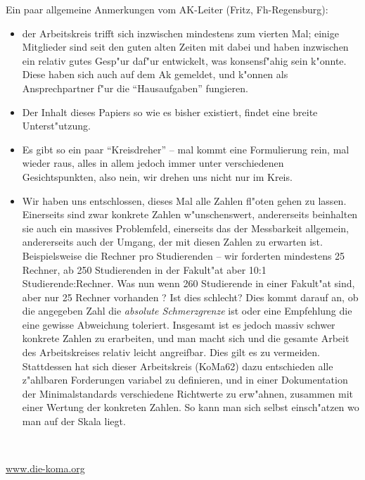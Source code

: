 \documentclass[10pt,twoside,a5paper,openright]{book}
\newenvironment{komacmt62}{%
\marginpar{\framebox{62}} %
\begin{center}\begin{minipage}{.8\textwidth}\normalfont \mdseries \sffamily \small \color{grau} }{\end{minipage}\end{center} %
}
\begin{document}




\newpage
\tableofcontents\thispagestyle{fancy}


\setlength{\parskip}{1.5ex}

\begin{kcmt62}
\begin{komacmt62}
Ein paar allgemeine Anmerkungen vom AK-Leiter (Fritz, Fh-Regensburg):
\begin{itemize}
\item der Arbeitskreis trifft sich inzwischen mindestens zum vierten Mal; einige
 Mitglieder sind seit den guten alten Zeiten mit dabei und haben inzwischen ein
 relativ gutes Gesp"ur daf"ur entwickelt, was konsensf"ahig sein k"onnte. Diese
 haben sich auch auf dem Ak gemeldet, und k"onnen als Ansprechpartner f"ur die
 "`Hausaufgaben"' fungieren.
\item Der Inhalt dieses Papiers so wie es bisher existiert, findet eine breite
 Unterst"utzung.
\item Es gibt so ein paar "`Kreisdreher"' -- mal kommt eine Formulierung rein, mal
 wieder raus, alles in allem jedoch immer unter verschiedenen Gesichtspunkten,
 also nein, wir drehen uns nicht nur im Kreis.
\item Wir haben uns entschlossen, dieses Mal alle Zahlen fl"oten gehen zu lassen.
 Einerseits sind zwar konkrete Zahlen w"unschenswert, andererseits beinhalten sie
 auch ein massives Problemfeld, einerseits das der Messbarkeit allgemein, andererseits
 auch der Umgang, der mit diesen Zahlen zu erwarten ist. Beispielsweise die Rechner
 pro Studierenden -- wir forderten mindestens 25 Rechner, ab 250 Studierenden in
 der Fakult"at aber 10:1 Studierende:Rechner. Was nun wenn 260 Studierende in einer
 Fakult"at sind, aber nur 25 Rechner vorhanden ? Ist dies schlecht? Dies kommt darauf
 an, ob die angegeben Zahl die \emph{absolute Schmerzgrenze} ist oder eine Empfehlung
 die eine gewisse Abweichung toleriert. Insgesamt ist es jedoch massiv schwer konkrete
 Zahlen zu erarbeiten, und man macht sich und die gesamte Arbeit des Arbeitskreises
 relativ leicht angreifbar. Dies gilt es zu vermeiden. Stattdessen hat sich dieser
 Arbeitskreis (KoMa62) dazu entschieden alle z"ahlbaren Forderungen variabel zu
 definieren, und in einer Dokumentation der Minimalstandards verschiedene Richtwerte
 zu erw"ahnen, zusammen mit einer Wertung der konkreten Zahlen. So kann man sich
 selbst einsch"atzen wo man auf der Skala liegt.
\end{itemize}
\end{komacmt62}
\end{kcmt62}

\mainmatter

\newpage






\newpage
\thispagestyle{empty}
~
\vfill
\begin{center}
\url{www.die-koma.org}
\end{center}
\end{document}
